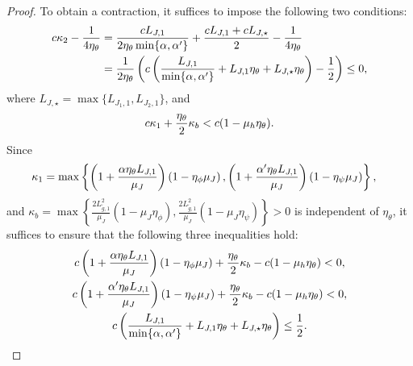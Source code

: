 \documentclass{article}
\theoremstyle{plain}
\theoremstyle{definition}
\theoremstyle{remark}
\begin{document}
\begin{proof}
To obtain a contraction, it suffices to impose the following two conditions:
    \begin{align}
        c \kappa_2 - \frac{1}{4\eta_\theta} & =  \frac{cL_{J,1}}{2\eta_\theta \min \{\alpha,\alpha'\}}+ \frac{cL_{J,1} + cL_{J,\star}}{2} - \frac{1}{4\eta_\theta} \\
        & = \frac{1}{2\eta_\theta} \left( c \left( \frac{L_{J,1}}{\min \{\alpha,\alpha'\}} + L_{J,1} \eta_\theta + L_{J,\star} \eta_\theta \right) - \frac{1}{2} \right) \leq 0, \notag
    \end{align}
    where $L_{J,\star} = \max\{L_{J_1,1},L_{J_2,1}\}$,
    and 
    \begin{align}
        c \kappa_1 + \frac{\eta_\theta}{2}\kappa_b < c (1 - \mu_h \eta_\theta). \notag
    \end{align}
    Since 
    \begin{align}
        \kappa_1 & = \max\left\{ \left( 1 +\frac{\alpha  \eta_\theta L_{J,1}}{\mu_J} \right)\left(1 - \eta_\phi \mu_J\right), \left( 1 +\frac{\alpha' \eta_\theta L_{J,1}}{\mu_J} \right)\left(1 - \eta_\psi \mu_J\right) \right\}, \notag
    \end{align} 
    and $\kappa_b= \max\left\{\frac{2L_{\widetilde{g},1}^2}{\mu_J}(1 -\mu_J \eta_\phi), \frac{2L_{\widetilde{g},1}^2}{\mu_J}(1 - \mu_J \eta_\psi) \right\} > 0$ is independent of $\eta_\theta$, it suffices to ensure that the following
three inequalities hold:
    \begin{gather}
        c\left( 1 +\frac{\alpha \eta_\theta L_{J,1}}{\mu_J} \right)\left(1 - \eta_\phi \mu_J\right) + \frac{\eta_\theta}{2}\kappa_b - c(1 - \mu_h \eta_\theta) < 0 , \notag\\
        c\left( 1 +\frac{\alpha' \eta_\theta L_{J,1}}{\mu_J} \right)\left(1 - \eta_\psi \mu_J\right) + \frac{\eta_\theta}{2}\kappa_b - c(1 - \mu_h \eta_\theta) < 0 , \notag\\
         c \left( \frac{L_{J,1}}{\min \{\alpha,\alpha'\}} + L_{J,1} \eta_\theta + L_{J,\star} \eta_\theta \right) \leq \frac{1}{2}. \notag
    \end{gather}


\end{proof}
\end{document}
